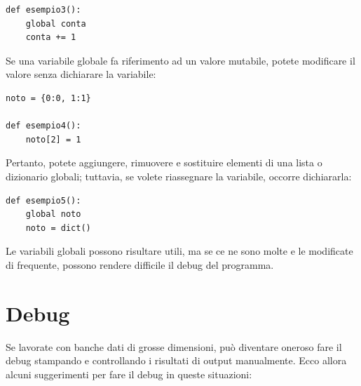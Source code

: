 \documentclass[10pt]{book}
\begin{document}
\begin{verbatim}
def esempio3():
    global conta
    conta += 1
\end{verbatim}
%
Se una variabile globale fa riferimento ad un valore mutabile, potete modificare il valore senza dichiarare la variabile:

\begin{verbatim}
noto = {0:0, 1:1}

def esempio4():
    noto[2] = 1
\end{verbatim}
%
Pertanto, potete aggiungere, rimuovere e sostituire elementi di una lista o dizionario globali; tuttavia, se volete riassegnare la variabile, occorre dichiararla:

\begin{verbatim}
def esempio5():
    global noto
    noto = dict()
\end{verbatim}
%
Le variabili globali possono risultare utili, ma se ce ne sono molte e le modificate di frequente, possono rendere difficile il debug del programma. 


\section{Debug}

Se lavorate con banche dati di grosse dimensioni, può diventare oneroso fare il debug stampando e controllando i risultati di output manualmente. Ecco allora alcuni suggerimenti per fare il debug in queste situazioni:
\end{document}
